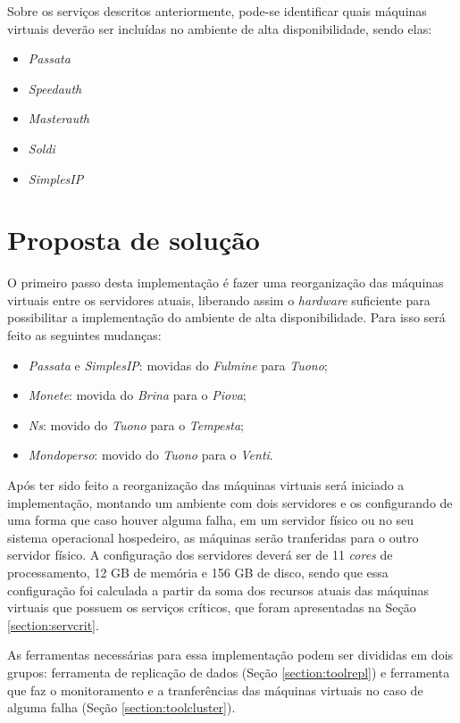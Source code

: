 Sobre os serviços descritos anteriormente, pode-se identificar quais máquinas virtuais deverão ser incluídas no 
ambiente de alta disponibilidade, sendo elas:
\begin{itemize}
 \item \textit{Passata}
 \item \textit{Speedauth}
 \item \textit{Masterauth}
 \item \textit{Soldi}
 \item \textit{SimplesIP}
\end{itemize}

\section{Proposta de solução}
\label{section:propostasolucao}

O primeiro passo desta implementação é fazer uma reorganização das máquinas virtuais entre os servidores atuais, liberando assim o 
\textit{hardware} suficiente para possibilitar a implementação do ambiente de alta disponibilidade. 
Para isso será feito as seguintes mudanças:
\begin{itemize}
 \item \textit{Passata} e \textit{SimplesIP}: movidas do \textit{Fulmine} para \textit{Tuono};
 \item \textit{Monete}: movida do \textit{Brina} para o \textit{Piova};
 \item \textit{Ns}: movido do \textit{Tuono} para o \textit{Tempesta};
 \item \textit{Mondoperso}: movido do \textit{Tuono} para o \textit{Venti}.
\end{itemize}

Após ter sido feito a reorganização das máquinas virtuais será iniciado a implementação, montando um ambiente com dois servidores e os 
configurando de uma forma que caso houver alguma falha, em um servidor físico ou no seu sistema operacional hospedeiro, as máquinas serão 
tranferidas para o outro servidor físico. 
A configuração dos servidores deverá ser de 11 \textit{cores} de processamento, 12 GB de memória e 156 GB de disco, sendo que essa configuração 
foi calculada a partir da soma dos recursos atuais das máquinas virtuais que possuem os serviços críticos, que foram apresentadas na Seção 
\ref{section:servcrit}.

As ferramentas necessárias para essa implementação podem ser divididas em dois grupos: ferramenta de replicação de dados 
(Seção \ref{section:toolrepl}) e ferramenta que faz o monitoramento e a tranferências das máquinas virtuais no caso de alguma falha 
(Seção \ref{section:toolcluster}).

